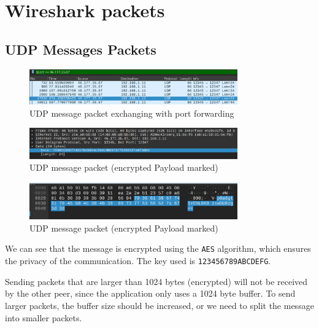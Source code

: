 \documentclass{article}
\begin{document}
\section{Wireshark packets}

\subsection{UDP Messages Packets}
\begin{figure}[h]
    \centering
    \includegraphics[width=0.8\textwidth]{udp-messages-1.png}
    \caption{UDP message packet exchanging with port forwarding}
    \label{fig:udp-messages-1}
\end{figure}

\begin{figure}[h]
    \centering
    \includegraphics[width=0.8\textwidth]{udp-messages-2.png}
    \caption{UDP message packet (encrypted Payload marked)}
    \label{fig:udp-messages-2}
\end{figure}

\begin{figure}[h]
    \centering
    \includegraphics[width=0.8\textwidth]{udp-messages-3.png}
    \caption{UDP message packet (encrypted Payload marked)}
    \label{fig:udp-messages-3}
\end{figure}

We can see that the message is encrypted using the \texttt{AES} algorithm, which ensures the privacy of the communication.
The key used is \texttt{123456789ABCDEFG}.

Sending packets that are larger than 1024 bytes (encrypted) will not be received by the other peer, since the application only
uses a 1024 byte buffer. To send larger packets, the buffer size should be increased, or we need to split the message into smaller packets.
\end{document}
